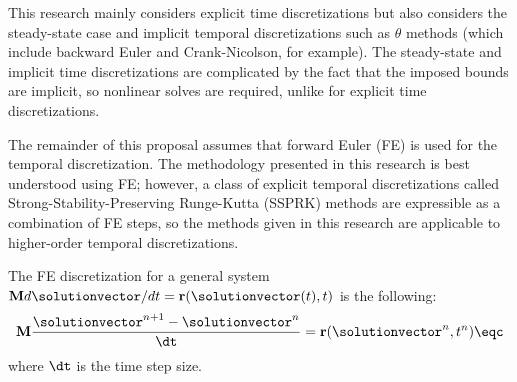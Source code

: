 This research mainly considers explicit time discretizations but also considers
the steady-state case and implicit
temporal discretizations such as $\theta$ methods (which include backward
Euler and Crank-Nicolson, for example). The steady-state and implicit time
discretizations are complicated by the fact that the
imposed bounds are implicit, so nonlinear solves are required, unlike
for explicit time discretizations.

The remainder of this proposal assumes that forward Euler (FE) is used for the
temporal discretization. The methodology presented in this research is best
understood using FE; however, a class of explicit temporal discretizations
called Strong-Stability-Preserving Runge-Kutta (SSPRK) methods are expressible
as a combination of FE steps, so the methods given in this research are
applicable to higher-order temporal discretizations.

The FE discretization for a general system $\mathbf{M}d\solutionvector/dt=
\mathbf{r}(\solutionvector(t),t)$ is the following:
\begin{equation}
  \mathbf{M}\frac{\solutionvector^{n+1}-\solutionvector^n}{\dt} =
    \mathbf{r}(\solutionvector^n,t^n) \eqc
\end{equation}
where $\dt$ is the time step size.
